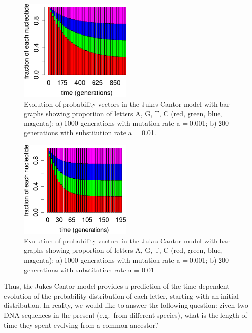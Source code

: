 \documentclass[
  letterpaper,
  DIV=11,
  numbers=noendperiod]{scrreprt}
\begin{document}
\begin{figure}

{\centering \includegraphics[width=0.49\textwidth,height=\textheight]{./markov_eigen_files/figure-pdf/bio14-1-1.pdf}

}

\caption{Evolution of probability vectors in the Jukes-Cantor model with
bar graphs showing proportion of letters A, G, T, C (red, green, blue,
magenta): a) 1000 generations with mutation rate a = 0.001; b) 200
generations with substitution rate a = 0.01.}

\end{figure}

\begin{figure}

{\centering \includegraphics[width=0.49\textwidth,height=\textheight]{./markov_eigen_files/figure-pdf/bio14-1-2.pdf}

}

\caption{Evolution of probability vectors in the Jukes-Cantor model with
bar graphs showing proportion of letters A, G, T, C (red, green, blue,
magenta): a) 1000 generations with mutation rate a = 0.001; b) 200
generations with substitution rate a = 0.01.}

\end{figure}

Thus, the Jukes-Cantor model provides a prediction of the time-dependent
evolution of the probability distribution of each letter, starting with
an initial distribution. In reality, we would like to answer the
following question: given two DNA sequences in the present (e.g.~from
different species), what is the length of time they spent evolving from
a common ancestor?
\end{document}
